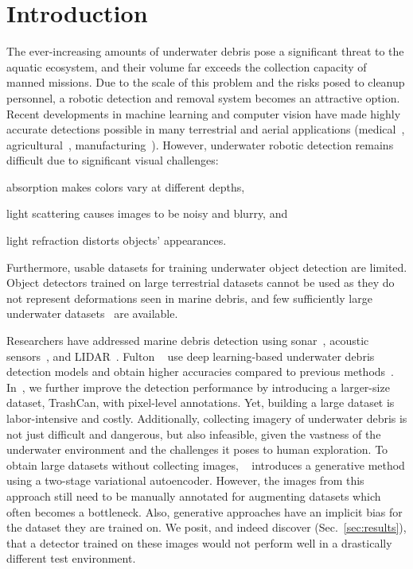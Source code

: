 \section{Introduction}
\label{sec:intro}
The ever-increasing amounts of underwater debris pose a significant threat to the aquatic ecosystem, and their volume far exceeds the collection capacity of manned missions.
Due to the scale of this problem and the risks posed to cleanup personnel, a robotic detection and removal system becomes an attractive option.
Recent developments in machine learning and computer vision have made highly accurate detections possible in many terrestrial and aerial applications (\eg medical~\cite{litjens2017survey}, agricultural~\cite{zhang2020applications}, manufacturing~\cite{ahmad2022deep}). 
However, underwater robotic detection remains difficult due to significant visual challenges: 
\begin{enumerate*}
\item absorption makes colors vary at different depths, 
\item light scattering causes images to be noisy and blurry, and 
\item light refraction distorts objects' appearances.
\end{enumerate*}
Furthermore, usable datasets for training underwater object detection are limited. 
Object detectors trained on large terrestrial datasets cannot be used as they do not represent deformations seen in marine debris, and few sufficiently large underwater datasets~\cite{fulton2019robotic, hong2020trashcan} are available. 



Researchers have addressed marine debris detection using sonar~\cite{Toro2016Trash}, acoustic sensors~\cite{acousticdetect}, and LIDAR~\cite{ge_semi-automatic_2016}. 
Fulton \etal~\cite{fulton2019robotic} use deep learning-based underwater debris detection models and obtain higher accuracies compared to previous methods~\cite{Toro2016Trash, acousticdetect, ge_semi-automatic_2016}.
In~\cite{hong2020trashcan}, we further improve the detection performance by introducing a larger-size dataset, TrashCan, with pixel-level annotations.
Yet, building a large dataset is labor-intensive and costly. Additionally, collecting imagery of underwater debris is not just difficult and dangerous, but also infeasible, given the vastness of the underwater environment and the challenges it poses to human exploration.  
To obtain large datasets without collecting images, ~\cite{hong_generative_2020} introduces a generative method using a two-stage variational autoencoder. 
However, the images from this approach still need to be manually annotated for augmenting datasets which often becomes a bottleneck. 
Also, generative approaches have an implicit bias for the dataset they are trained on. 
We posit, and indeed discover (Sec.~\ref{sec:results}), that a detector trained on these images would not perform well in a drastically different test environment.


